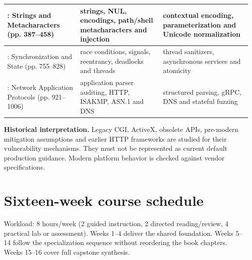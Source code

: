 \documentclass[10pt,letterpaper]{article}
\begin{document}
\begin{longtable}{>{\raggedright\arraybackslash}p{}>{\raggedright\arraybackslash}p{}>{\raggedright\arraybackslash}p{}}
8: Strings and Metacharacters (pp. 387--458) & strings, NUL, encodings, path/shell metacharacters and injection & contextual encoding, parameterization and Unicode normalization\\\midrule
13: Synchronization and State (pp. 755--828) & race conditions, signals, reentrancy, deadlocks and threads & thread sanitizers, asynchronous services and atomicity\\\midrule
16: Network Application Protocols (pp. 921--1006) & application parser auditing, HTTP, ISAKMP, ASN.1 and DNS & structured parsing, gRPC, DNS and stateful fuzzing\\\midrule
\bottomrule\end{longtable}\endgroup
\begin{historynote}\textbf{Historical interpretation.} Legacy CGI, ActiveX, obsolete APIs, pre-modern mitigation assumptions and earlier HTTP frameworks are studied for their vulnerability mechanisms. They must not be represented as current default production guidance. Modern platform behavior is checked against vendor specifications.\end{historynote}
\section{Sixteen-week course schedule}
Workload: 8 hours/week (2 guided instruction, 2 directed reading/review, 4 practical lab or assessment). Weeks 1--4 deliver the shared foundation. Weeks 5--14 follow the specialization sequence without reordering the book chapters. Weeks 15--16 cover full capstone synthesis.
\end{document}
